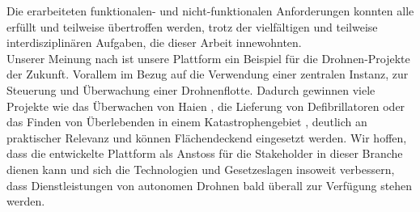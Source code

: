 Die erarbeiteten funktionalen- und nicht-funktionalen Anforderungen konnten alle erfüllt und teilweise übertroffen werden, trotz der vielfältigen und teilweise interdisziplinären Aufgaben, die dieser Arbeit innewohnten. \\

Unserer Meinung nach ist unsere Plattform ein Beispiel für die Drohnen-Projekte der Zukunft. Vorallem im Bezug auf die Verwendung einer zentralen Instanz, zur Steuerung und Überwachung einer Drohnenflotte. Dadurch gewinnen viele Projekte wie das Überwachen von Haien \cite{shark}, die Lieferung von Defibrillatoren \cite{defibrillator-drone} oder das Finden von Überlebenden in einem Katastrophengebiet \cite{catastrophic-drone}, deutlich an praktischer Relevanz und können Flächendeckend eingesetzt werden. Wir hoffen, dass die entwickelte Plattform als Anstoss für die Stakeholder in dieser Branche dienen kann und sich die Technologien und Gesetzeslagen insoweit verbessern, dass Dienstleistungen von autonomen Drohnen bald überall zur Verfügung stehen werden.





